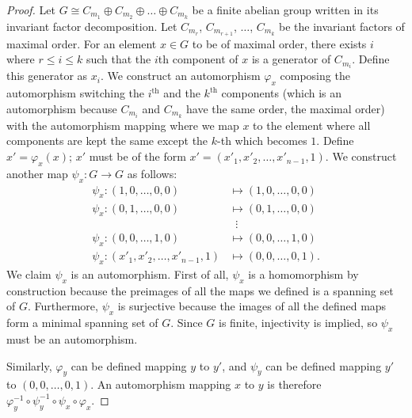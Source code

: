 \documentclass[10pt,a4paper]{amsart}
\renewcommand{\leq}{\leqslant}
\renewcommand{\phi}{\varphi}
\begin{document}
\begin{proof}
Let $G \cong C_{m_1}\oplus C_{m_2} \oplus \dots \oplus C_{m_k}$ be a finite abelian group written in its invariant factor decomposition. Let $C_{m_r}$, $C_{m_{r+1}}$, $\dots$, $C_{m_k}$ be the invariant factors of maximal order. For an element $x \in G$ to be of maximal order, there exists $i$ where $r \leq i \leq k$ such that the $i$th component of $x$ is a generator of $C_{m_i}$. Define this generator as $x_i$. We construct an automorphism $\phi_{x}$ composing the automorphism switching the $i^\text{th}$ and the $k^\text{th}$ components (which is an automorphism because $C_{m_i}$ and $C_{m_k}$ have the same order, the maximal order) with the automorphism mapping where we map $x$ to the element where all components are kept the same except the $k$-th which becomes $1$. Define $x' = \phi_x(x)$; $x'$ must be of the form $x' = (x'_1, x'_2, \dots, x'_{n-1}, 1)$. We construct another map $\psi_x : G \rightarrow G$ as follows: \begin{align*}
\psi_x : (1, 0, \dots, 0, 0) &\mapsto (1, 0, \dots, 0, 0)\\
\psi_x : (0, 1, \dots, 0, 0) &\mapsto (0, 1, \dots, 0, 0)\\
&\;\;\vdots\\
\psi_x : (0, 0, \dots, 1, 0) &\mapsto (0, 0, \dots, 1, 0)\\
\psi_x : (x'_1, x'_2, \dots, x'_{n-1}, 1) &\mapsto (0, 0, \dots, 0, 1).
\end{align*}
We claim $\psi_x$ is an automorphism. First of all, $\psi_x$ is a homomorphism by construction because the preimages of all the maps we defined is a spanning set of $G$. Furthermore, $\psi_x$ is surjective because the images of all the defined maps form a minimal spanning set of $G$. Since $G$ is finite, injectivity is implied, so $\psi_x$ must be an automorphism. 

Similarly, $\phi_y$ can be defined mapping $y$ to $y'$, and $\psi_y$ can be defined mapping $y'$ to $(0, 0, \dots, 0, 1)$. An automorphism mapping $x$ to $y$ is therefore $\phi_y^{-1}\circ\psi_y^{-1}\circ\psi_x\circ\phi_x$. 
\end{proof}
\end{document}
